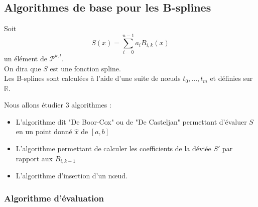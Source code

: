 
\subsection{Algorithmes de base pour les B-splines}
Soit \[S(x)=\sum_{i=0}^{n-1} a_i B_{i,k}(x)\]
un élément de $\mathcal{P}^{k,t}$. \\
On dira que $S$ est une fonction spline.\\
Les B-splines sont calculées à l'aide d'une suite de n\oe uds $t_0,...,t_m$ et définies sur $\mathbb{R}$.

\bigskip
Nous allons étudier 3 algorithmes :
\begin{itemize}
	\item L'algorithme dit "De Boor-Cox" ou de "De Casteljan" permettant d'évaluer $S$ en un point donné $\hat{x}$ de $[a,b]$
	\item L'algorithme permettant de calculer les coefficients de la déviée $S'$ par rapport aux $B_{i,k-1}$
	\item L'algorithme d'insertion d'un n\oe ud.
\end{itemize}

\subsubsection{Algorithme d'évaluation}


